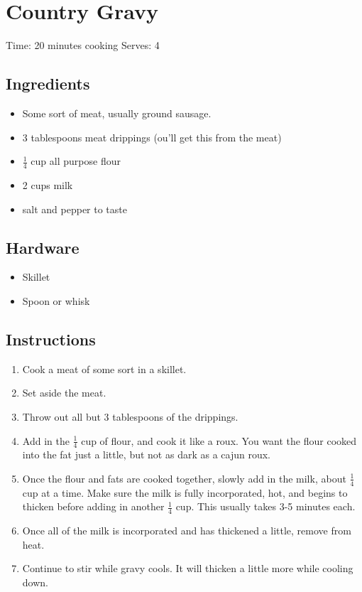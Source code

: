 \section{Country Gravy}
\label{countryGravy}
\setcounter{secnumdepth}{0}
Time: 20 minutes cooking
Serves: 4

\begin{multicols}{2}
\subsection*{Ingredients}
\begin{itemize}
    \item Some sort of meat, usually ground sausage.
    \item 3 tablespoons meat drippings (ou'll get this from the meat)
    \item \( \frac{1}{4} \) cup all purpose flour
    \item 2 cups milk
    \item salt and pepper to taste
\end{itemize}

\subsection*{Hardware}
\begin{itemize}
    \item Skillet
    \item Spoon or whisk
\end{itemize}
\clearpage

\subsection*{Instructions}
\begin{enumerate}
    \item Cook a meat of some sort in a skillet.
    \item Set aside the meat.
    \item Throw out all but 3 tablespoons of the drippings.
    \item Add in the \( \frac{1}{4} \) cup of flour, and cook it like a roux. You want the flour cooked into the fat just a little, but not as dark as a cajun roux.
    \item Once the flour and fats are cooked together, slowly add in the milk, about \( \frac{1}{4} \) cup at a time. Make sure the milk is fully incorporated, hot, and begins to thicken before adding in another \( \frac{1}{4} \) cup. This usually takes 3-5 minutes each.
    \item Once all of the milk is incorporated and has thickened a little, remove from heat.
    \item Continue to stir while gravy cools. It will thicken a little more while cooling down.
\end{enumerate}


\end{multicols}
